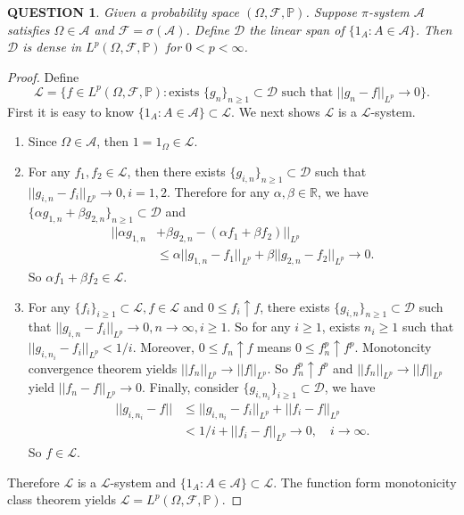 \documentclass[12pt]{article}
\renewcommand{\(}{\left(}%
\renewcommand{\)}{\right)}%
\renewcommand{\[}{\left[}%
\renewcommand{\]}{\right]}%
\renewcommand{\r}{\mathbb{R}}
\renewcommand{\a}{\mathscr{A}}
\newcommand{\p}{\mathbb{P}}
\newcommand{\f}{\mathscr{F}}
\newtheorem{question}{QUESTION}[section]}
\newtheorem{proof}{Proof.}}
\begin{document}
   \begin{question}
   	Given a probability space $(\Omega,\f,\p)$. Suppose $\pi$-system $\a$ satisfies $\Omega\in\a$ and $\f=\sigma(\a)$. Define $\mathcal{D}$ the linear span of $\{1_A:A\in\a\}$. Then $\mathcal{D}$ is dense in $L^p(\Omega,\f,\p)$ for $0<p<\infty$.
   \end{question}
   \begin{proof}
   	Define
   	\begin{equation*}
   		\mathscr{L}=\{f\in L^p(\Omega,\f,\p): \text{exists $\{g_n\}_{n\geq 1}\subset \mathcal{D}$ such that $||g_n-f||_{L^p}\to0$}\}.
   	\end{equation*}
   	First it is easy to know $\{1_A:A\in\a\}\subset \mathscr{L}$. We next shows $\mathscr{L}$ is a $\mathscr{L}$-system. 
   	\begin{enumerate}
   		\item Since $\Omega\in\a$, then $1=1_\Omega\in\mathscr{L}$.
   		\item For any $f_1,f_2\in \mathscr{L}$, then there exists $\{g_{i,n}\}_{n\geq 1}\subset \mathcal{D}$ such that $||g_{i,n}-f_i||_{L^p}\to 0,i=1,2$. Therefore for any $\alpha,\beta\in \r$, we have $\{\alpha g_{1,n}+\beta g_{2,n}\}_{n\geq 1}\subset\mathcal{D}$ and 
   		\begin{equation*}
   			\begin{split}
   				||\alpha g_{1,n}&+\beta g_{2,n}-(\alpha f_{1}+\beta f_{2})||_{L^p}\\
   				&\leq \alpha ||g_{1,n}-f_1||_{L^p}+ \beta ||g_{2,n}-f_2||_{L^p}\to0.
   			\end{split}
   		\end{equation*}
   		So $\alpha f_{1}+\beta f_{2}\in \mathscr{L}$.
   		\item For any $\{f_i\}_{i\geq 1}\subset\mathscr{L},f\in \mathscr{L}$ and $0\leq f_i\uparrow f$, there exists $\{g_{i,n}\}_{n\geq 1}\subset \mathcal{D}$ such that $||g_{i,n}-f_i||_{L^p}\to 0,n\to\infty,i\geq 1$. So for any $i\geq 1$, exists $n_i\geq 1$ such that $||g_{i,n_i}-f_i||_{L^p}<1/i$. Moreover, $0\leq f_n\uparrow f$ means $0\leq f_n^p\uparrow f^p$. Monotoncity convergence theorem yields $||f_n||_{L^p}\to ||f||_{L^p}$. So $f_n^p\uparrow f^p$ and $||f_n||_{L^p}\to ||f||_{L^p}$ yield $||f_n-f||_{L^p}\to0$. Finally, consider $\{g_{i,n_i}\}_{i\geq 1}\subset \mathcal{D}$, we have 
   		\begin{equation*}
   			\begin{split}
   				||g_{i,n_i}-f||&\leq ||g_{i,n_i}-f_i||_{L^p}+||f_i-f||_{L^p}\\
   				&<1/i+||f_i-f||_{L^p}\to 0,\quad i\to\infty.
   			\end{split}
   		\end{equation*}
   		So $f\in \mathscr{L}$.
   	\end{enumerate}
   	Therefore $\mathscr{L}$ is a $\mathscr{L}$-system and $\{1_A:A\in\a\}\subset \mathscr{L}$. The function form monotonicity class theorem yields $\mathscr{L}=L^p(\Omega,\f,\p)$.
   \end{proof}
   
\end{document}
